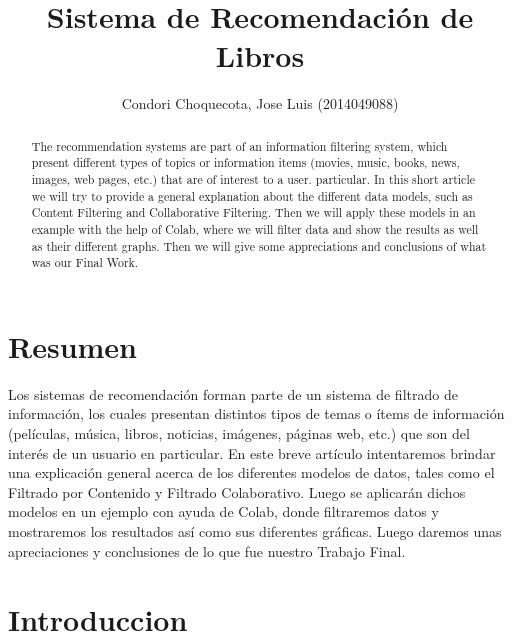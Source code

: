 \documentclass[preprint,12pt]{elsarticle}
\begin{document}
	
	\begin{frontmatter}
		
		
		\title{\huge Sistema de Recomendación de Libros}
		\author{Condori Choquecota, Jose Luis        (2014049088)}
		
		
		\address{Tacna, Perú}
		
		\begin{abstract}
			
The recommendation systems are part of an information filtering system, which present different types of topics or information items (movies, music, books, news, images, web pages, etc.) that are of interest to a user. particular. In this short article we will try to provide a general explanation about the different data models, such as Content Filtering and Collaborative Filtering.
Then we will apply these models in an example with the help of Colab, where we will filter data and show the results as well as their different graphs.
Then we will give some appreciations and conclusions of what was our Final Work.\\
		\end{abstract}
\end{frontmatter}

	
	
	\section{Resumen}
Los sistemas de recomendación forman parte de un sistema de filtrado de información, los cuales presentan distintos tipos de temas o ítems de información (películas, música, libros, noticias, imágenes, páginas web, etc.) que son del interés de un usuario en particular. En este breve artículo intentaremos brindar una explicación general acerca de los diferentes modelos de datos, tales como el Filtrado por Contenido y Filtrado Colaborativo.
Luego se aplicarán dichos modelos en un ejemplo con ayuda de Colab, donde filtraremos datos y mostraremos los resultados así como sus diferentes gráficas.
Luego daremos unas apreciaciones y conclusiones de lo que fue nuestro Trabajo Final.\\
	
	

\section{Introduccion}
\end{document}

